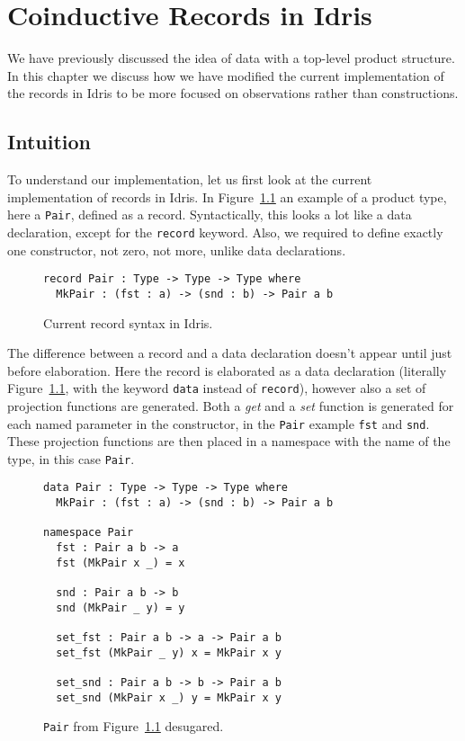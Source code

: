 \chapter{Coinductive Records in Idris}
\label{cha:coind-records-idris}
We have previously discussed the idea of data with a top-level product
structure. In this chapter we discuss how we have modified the current
implementation of the records in Idris to be more focused on observations rather
than constructions.

\section{Intuition}
To understand our implementation, let us first look at the current
implementation of records in Idris. In Figure~\ref{fig:records_in_idris} an
example of a product type, here a \texttt{Pair}, defined as a
record. Syntactically, this looks a lot like a data declaration, except for the
\texttt{record} keyword. Also, we required to define exactly one
constructor, not zero, not more, unlike data declarations.

\begin{figure}[h]
\begin{lstlisting}
record Pair : Type -> Type -> Type where
  MkPair : (fst : a) -> (snd : b) -> Pair a b
\end{lstlisting}
  \caption{Current record syntax in Idris.}
  \label{fig:records_in_idris}
\end{figure}

The difference between a record and a data declaration doesn't appear until just
before elaboration. Here the record is elaborated as a data declaration
(literally Figure~\ref{fig:records_in_idris}, with the keyword \texttt{data}
instead of \texttt{record}), however also a set of projection functions are
generated. Both a \emph{get} and a \emph{set} function is generated for each
named parameter in the constructor, in the \texttt{Pair} example \texttt{fst}
and \texttt{snd}. These projection functions are then placed in a namespace with
the name of the type, in this case \texttt{Pair}.

\begin{figure}[h]
\begin{lstlisting}
data Pair : Type -> Type -> Type where
  MkPair : (fst : a) -> (snd : b) -> Pair a b

namespace Pair
  fst : Pair a b -> a
  fst (MkPair x _) = x

  snd : Pair a b -> b
  snd (MkPair _ y) = y

  set_fst : Pair a b -> a -> Pair a b
  set_fst (MkPair _ y) x = MkPair x y

  set_snd : Pair a b -> b -> Pair a b
  set_snd (MkPair x _) y = MkPair x y
\end{lstlisting}
  \caption{\texttt{Pair} from Figure~\ref{fig:records_in_idris} desugared.}
  \label{fig:pair_desugared}
\end{figure}

